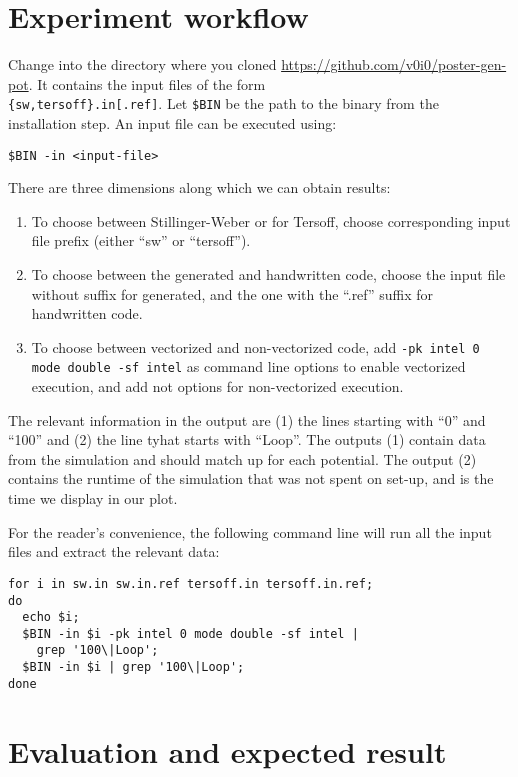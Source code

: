 \documentclass[sigconf]{acmart}
\begin{document}
\section{Experiment workflow}

Change into the directory where you cloned \url{https://github.com/v0i0/poster-gen-pot}.
It contains the input files of the form\\\verb+{sw,tersoff}.in[.ref]+.
Let \verb+$BIN+ be the path to the binary from the installation step.
An input file can be executed using:
\begin{verbatim}
$BIN -in <input-file>
\end{verbatim}

There are three dimensions along which we can obtain results:

\begin{enumerate}
\item To choose between Stillinger-Weber or for Tersoff, choose corresponding input file prefix (either ``sw'' or ``tersoff'').
\item To choose between the generated and handwritten code, choose the input file without suffix for generated, and the one with the ``.ref'' suffix for handwritten code.
\item To choose between vectorized and non-vectorized code, add \verb+-pk intel 0 mode double -sf intel+ as command line options to enable vectorized execution, and add not options for non-vectorized execution.
\end{enumerate}

The relevant information in the output are (1) the lines starting with ``0'' and ``100'' and (2) the line tyhat starts with ``Loop''.
The outputs (1) contain data from the simulation and should match up for each potential.
The output (2) contains the runtime of the simulation that was not spent on set-up, and is the time we display in our plot.

For the reader's convenience, the following command line will run all the input files and extract the relevant data:

\begin{verbatim}
for i in sw.in sw.in.ref tersoff.in tersoff.in.ref;
do
  echo $i;
  $BIN -in $i -pk intel 0 mode double -sf intel | 
    grep '100\|Loop';
  $BIN -in $i | grep '100\|Loop';
done
\end{verbatim}

\clearpage
\section{Evaluation and expected result}
\end{document}
